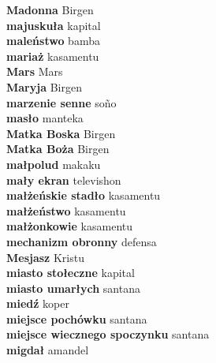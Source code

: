 \textbf{ Madonna  } Birgen \\
\textbf{ majuskuła  } kapital \\
\textbf{ maleństwo  } bamba \\
\textbf{ mariaż  } kasamentu \\
\textbf{ Mars  } Mars \\
\textbf{ Maryja  } Birgen \\
\textbf{ marzenie senne  } soño \\
\textbf{ masło  } manteka \\
\textbf{ Matka Boska  } Birgen \\
\textbf{ Matka Boża  } Birgen \\
\textbf{ małpolud  } makaku \\
\textbf{ mały ekran  } televishon \\
\textbf{ małżeńskie stadło  } kasamentu \\
\textbf{ małżeństwo  } kasamentu \\
\textbf{ małżonkowie  } kasamentu \\
\textbf{ mechanizm obronny  } defensa \\
\textbf{ Mesjasz  } Kristu \\
\textbf{ miasto stołeczne  } kapital \\
\textbf{ miasto umarłych  } santana \\
\textbf{ miedź  } koper \\
\textbf{ miejsce pochówku  } santana \\
\textbf{ miejsce wiecznego spoczynku  } santana \\
\textbf{ migdał  } amandel \\
